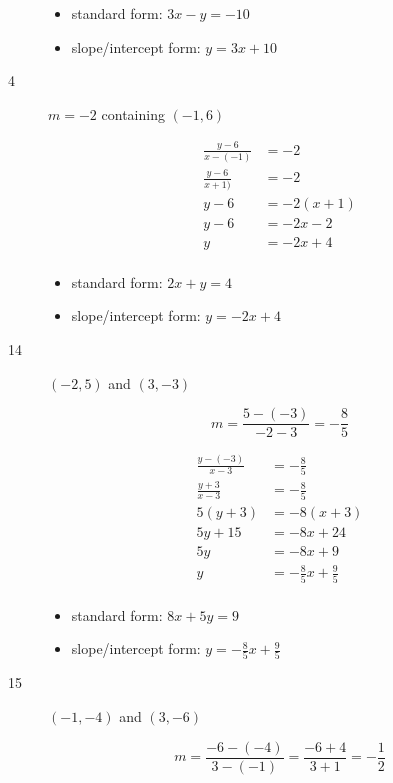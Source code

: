 \documentclass[fleqn,addpoints]{exam}
\begin{document}
\begin{description}
\begin{itemize}
  \item standard form: $3x-y=-10$
  \item slope/intercept form: $y = 3x+10$
\end{itemize}

\item[4]
$m = -2$ containing $(-1, 6)$

\begin{align*}
  \frac{y-6}{x - (-1)} &= -2 \\
  \frac{y-6}{x + 1)} &= -2 \\
  y-6 &= -2(x+1) \\
  y-6 &= -2x - 2 \\
  y &= -2x + 4 \\
\end{align*}

\begin{itemize}
  \item standard form: $2x+y=4$
  \item slope/intercept form: $y = -2x + 4 $
\end{itemize}

\item[14]

$(-2, 5)$ and $(3, -3)$

\[
  m = \frac{5 - (-3)}{-2-3} = - \frac{8}{5}
\]

\begin{align*}
  \frac{y - (-3)}{x-3} &= - \frac{8}{5} \\
  \frac{y + 3}{x-3} &= - \frac{8}{5} \\
  5(y+3) &= -8(x+3) \\
  5y+15 &= -8x+24 \\
  5y &= -8x+9 \\
  y &= - \frac{8}{5} x + \frac{9}{5} \\
\end{align*}

\begin{itemize}
  \item standard form: $8x+5y=9$
  \item slope/intercept form: $y = - \frac{8}{5} x + \frac{9}{5} $
\end{itemize}

\item[15]

$(-1, -4)$ and $(3, -6)$

\[
  m = \frac{-6 - (-4)}{3 - (-1)} = \frac{-6 + 4}{3+1} = - \frac{1}{2}
\]


\end{description}
\end{document}

